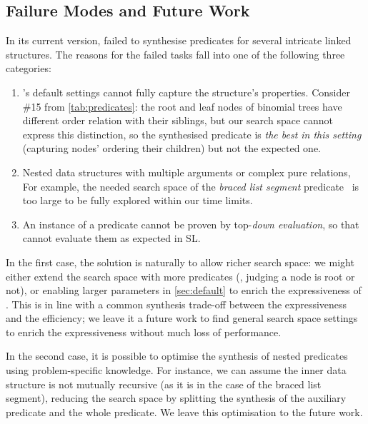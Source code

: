 
\subsection{Failure Modes and Future Work}
\label{sec:fail}


In its current version, \tool failed to synthesise predicates for
several intricate linked structures. The reasons for the failed tasks fall into one of the following three categories:

\begin{enumerate}[leftmargin=*,topsep=2pt]
\item \tool's default settings cannot fully capture the structure's
  properties. Consider \#15 from \autoref{tab:predicates}: the root
  and leaf nodes of binomial trees have different order relation with
  their siblings, but our search space cannot express this
  distinction, so the synthesised predicate is \emph{the best in this
    setting} (capturing nodes' ordering \wrt their children) but not
  the expected one.

\item Nested data structures with multiple arguments or complex pure
  relations, For example, the needed search space of the \emph{braced list
    segment} predicate~\cite{Reynolds08} is too large to be fully
  explored within our time limits.

\item An instance of a predicate cannot be proven by top-\emph{down
  evaluation}, so that \prolog cannot evaluate them as expected in SL.
\end{enumerate}

\noindent
%
In the first case, the solution is naturally to allow richer search space: we might either extend the search space with more predicates (\eg, judging a node is root or not), or enabling larger parameters in \autoref{sec:default} to enrich the expressiveness of \tool.
%
This is in line with a common synthesis trade-off between the
expressiveness and the efficiency; we leave it a future work to find general
search space settings to enrich the expressiveness without much loss
of performance.

In the second case, it is possible to optimise the synthesis of nested
predicates using problem-specific knowledge. For instance, we can
assume the inner data structure is not mutually recursive (as it is in
the case of the braced list segment), reducing the search space by
splitting the synthesis of the auxiliary predicate and the whole
predicate. We leave this optimisation to the future work.



